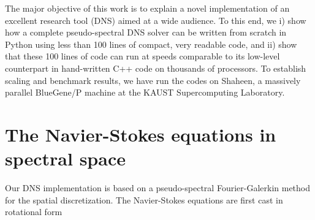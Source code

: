 \documentclass[final,1p,times]{elsarticle}
\begin{document}
The major objective of this work is to explain a novel implementation of an excellent research tool (DNS) aimed at a wide audience. To this end, we i) show how a complete pseudo-spectral DNS solver can be written from scratch in Python using less than 100 lines of compact, very readable code, and ii) show that these 100 lines of code can run at speeds comparable to its low-level counterpart in hand-written C++ code on thousands of processors. To establish scaling and benchmark results, we have run the codes on Shaheen, a massively parallel BlueGene/P machine at the KAUST Supercomputing Laboratory.

\section{The Navier-Stokes equations in spectral space}
Our DNS implementation is based on a pseudo-spectral Fourier-Galerkin method \cite{canuto1988} for the spatial discretization. The Navier-Stokes equations are first cast in rotational form
\end{document}
